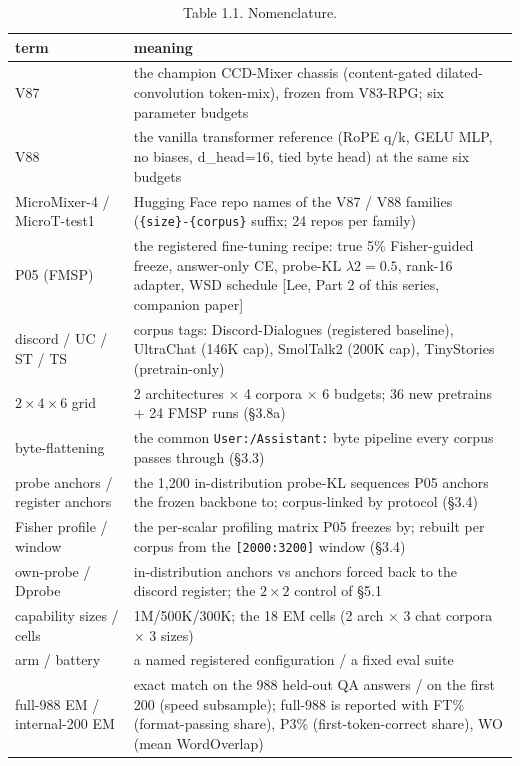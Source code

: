 \documentclass[11pt]{article}
\begin{document}
\begin{table}[!t]
\centering
\footnotesize
\caption*{Table 1.1. Nomenclature.}
\begin{tabular}{p{4.4cm}p{11.2cm}}
\toprule
term & meaning \\
\midrule
V87 & the champion CCD-Mixer chassis (content-gated dilated-convolution token-mix), frozen from V83-RPG; six parameter budgets \\
V88 & the vanilla transformer reference (RoPE q/k, GELU MLP, no biases, d\_head=16, tied byte head) at the same six budgets \\
MicroMixer-4 / MicroT-test1 & Hugging Face repo names of the V87 / V88 families (\texttt{\{size\}-\{corpus\}} suffix; 24 repos per family) \\
P05 (FMSP) & the registered fine-tuning recipe: true 5\% Fisher-guided freeze, answer-only CE, probe-KL $\lambda2 = 0.5$, rank-16 adapter, WSD schedule [Lee, Part 2 of this series, companion paper] \\
\midrule
discord / UC / ST / TS & corpus tags: Discord-Dialogues (registered baseline), UltraChat (146K cap), SmolTalk2 (200K cap), TinyStories (pretrain-only) \\
$2 \times 4 \times 6$ grid & 2 architectures $\times$ 4 corpora $\times$ 6 budgets; 36 new pretrains + 24 FMSP runs (\S3.8a) \\
byte-flattening & the common \texttt{User:/Assistant:} byte pipeline every corpus passes through (\S3.3) \\
probe anchors / register anchors & the 1,200 in-distribution probe-KL sequences P05 anchors the frozen backbone to; corpus-linked by protocol (\S3.4) \\
Fisher profile / window & the per-scalar profiling matrix P05 freezes by; rebuilt per corpus from the \texttt{[2000:3200]} window (\S3.4) \\
own-probe / Dprobe & in-distribution anchors vs anchors forced back to the discord register; the $2 \times 2$ control of \S5.1 \\
capability sizes / cells & 1M/500K/300K; the 18 EM cells (2 arch $\times$ 3 chat corpora $\times$ 3 sizes) \\
\midrule
arm / battery & a named registered configuration / a fixed eval suite \\
full-988 EM / internal-200 EM & exact match on the 988 held-out QA answers / on the first 200 (speed subsample); full-988 is reported with FT\% (format-passing share), P3\% (first-token-correct share), WO (mean WordOverlap) \\

\end{tabular}
\end{table}
\end{document}
